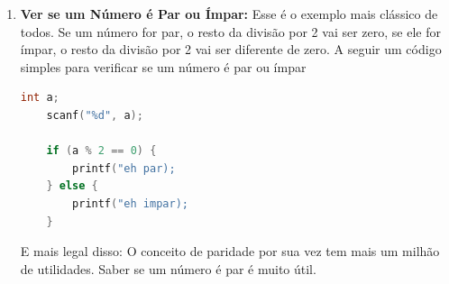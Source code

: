 \documentclass{article}
\begin{document}
\begin{enumerate}
    \item \textbf{Ver se um Número é Par ou Ímpar:} Esse é o exemplo mais clássico de todos. Se um número for par, o resto da divisão por 2 vai ser zero, se ele for ímpar, o resto da divisão por 2 vai ser diferente de zero. A seguir um código simples para verificar se um número é par ou ímpar
    \begin{lstlisting}[language=C]
    int a;
    scanf("%d", a);

    if (a % 2 == 0) {
        printf("eh par);
    } else {
        printf("eh impar); 
    }
    \end{lstlisting}
    E mais legal disso: O conceito de paridade por sua vez tem mais um milhão de utilidades. Saber se um número é par é muito útil.


\end{enumerate}
\end{document}

